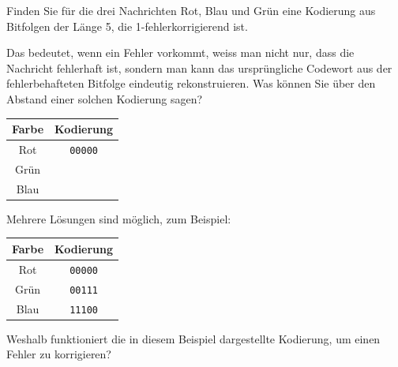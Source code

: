 \begin{myexercise}\label{ex:fehlerkorrektur}
    Finden Sie für die drei Nachrichten Rot, Blau und Grün eine Kodierung aus Bitfolgen der Länge 5, die 1-fehlerkorrigierend ist.

    Das bedeutet, wenn ein Fehler vorkommt, weiss man nicht nur, dass die Nachricht fehlerhaft ist, sondern man kann das ursprüngliche Codewort aus der fehlerbehafteten Bitfolge eindeutig rekonstruieren. Was können Sie über den Abstand einer solchen Kodierung sagen?

    \begin{table}[H]
        \centering
        \begin{tabular}{c|c}
            \textbf{Farbe} & \textbf{Kodierung} \\\midrule\midrule
            Rot            & \texttt{00000}     \\\midrule
            Grün           &                    \\\midrule
            Blau           &                    \\
        \end{tabular}
    \end{table}
    \begin{myanswer}
        Mehrere Lösungen sind möglich, zum Beispiel:

        \begin{table}[H]
            \centering
            \begin{tabular}{c|c}
                \textbf{Farbe} & \textbf{Kodierung} \\\midrule\midrule
                Rot            & \texttt{00000}     \\\midrule
                Grün           & \texttt{00111}     \\\midrule
                Blau           & \texttt{11100}     \\
            \end{tabular}
        \end{table}
        Weshalb funktioniert die in diesem Beispiel dargestellte Kodierung, um einen Fehler zu korrigieren?


\end{myanswer}
\end{myexercise}
